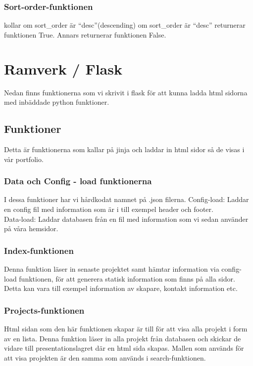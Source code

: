 \documentclass{TDP003mall}
\begin{document}
\subsubsection{Sort-order-funktionen}
kollar om sort\_order är ``desc''(descending) om sort\_order är ``desc'' returnerar funktionen True. Annars returnerar funktionen False. \pagebreak

\section{Ramverk / Flask}
Nedan finns funktionerna som vi skrivit i flask för att kunna ladda html sidorna med inbäddade python funktioner.

\subsection{Funktioner}
Detta är funktionerna som kallar på jinja och laddar in html sidor så de visas i vår portfolio.

\subsubsection{Data och Config - load funktionerna}
I dessa funktioner har vi hårdkodat namnet på .json filerna.
Config-load: Laddar en config fil med information som är i till exempel header och footer.\\
Data-load: Laddar databasen från en fil med information som vi sedan använder på våra hemsidor.

\subsubsection{Index-funktionen}
Denna funktion läser in senaste projektet samt hämtar information via config-load funktionen, för att generera statisk information som finns på alla sidor. Detta kan vara till exempel information av skapare, kontakt information etc.

\subsubsection{Projects-funktionen}
Html sidan som den här funktionen skapar är till för att visa alla projekt i form av en lista.
Denna funktion läser in alla projekt från databasen och skickar de vidare till presentationslagret där en html sida skapas. Mallen som används för att visa projekten är den samma som används i search-funktionen.
\end{document}

